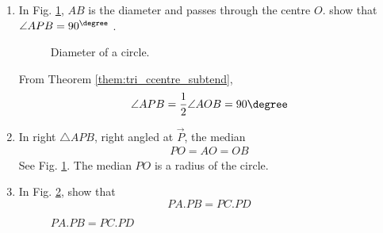 \begin{enumerate}[label=\arabic*.,ref=\thesubsection.\theenumi]
%
\item
In Fig. \ref{fig:circ_dia_rt}, $AB$ is the diameter and passes through the centre $O$.  show that $\angle APB = 90^{\degree}$ .

%
\begin{figure}[!ht]
	\begin{center}
		
		\resizebox{\columnwidth}{!}{}
	\end{center}
	\caption{Diameter of a circle.}
	\label{fig:circ_dia_rt}	
\end{figure}
%
\solution From Theorem \ref{them:tri_ccentre_subtend}, 
\begin{align}
\angle APB = \frac{1}{2}\angle AOB = 90\degree
\end{align}
%
\item In  right $\triangle APB$, right angled at $\vec{P}$, the median 
\begin{align}
PO = AO = OB
\end{align}
%
\solution See Fig. \ref{fig:circ_dia_rt}. The median $PO$ is a radius of the circle.
\item
	In Fig. \ref{fig:circ_chord_prod}, show that 
	\begin{equation}
	PA.PB = PC.PD
	\end{equation}
\begin{figure}[!ht]
	\begin{center}
		
		\resizebox{\columnwidth}{!}{}
	\end{center}
	\caption{$PA.PB = PC.PD$}
	\label{fig:circ_chord_prod}	
\end{figure}


\end{enumerate}
